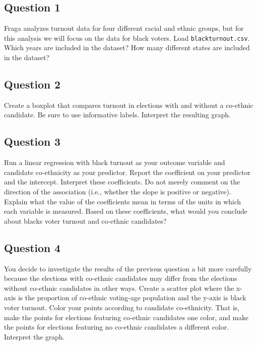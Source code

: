 \documentclass[]{article}
\begin{document}
\subsection{Question 1}\label{question-1}

Fraga analyzes turnout data for four different racial and ethnic groups,
but for this analysis we will focus on the data for black voters. Load
\texttt{blackturnout.csv}. Which years are included in the dataset? How
many different states are included in the dataset?

\subsection{Question 2}\label{question-2}

Create a boxplot that compares turnout in elections with and without a
co-ethnic candidate. Be sure to use informative labels. Interpret the
resulting graph.

\subsection{Question 3}\label{question-3}

Run a linear regression with black turnout as your outcome variable and
candidate co-ethnicity as your predictor. Report the coefficient on your
predictor and the intercept. Interpret these coefficients. Do not merely
comment on the direction of the association (i.e., whether the slope is
positive or negative). Explain what the value of the coefficients mean
in terms of the units in which each variable is measured. Based on these
coefficients, what would you conclude about blacks voter turnout and
co-ethnic candidates?

\subsection{Question 4}\label{question-4}

You decide to investigate the results of the previous question a bit
more carefully because the elections with co-ethnic candidates may
differ from the elections without co-ethnic candidates in other ways.
Create a scatter plot where the x-axis is the proportion of co-ethnic
voting-age population and the y-axis is black voter turnout. Color your
points according to candidate co-ethnicity. That is, make the points for
elections featuring co-ethnic candidates one color, and make the points
for elections featuring no co-ethnic candidates a different color.
Interpret the graph.
\end{document}
